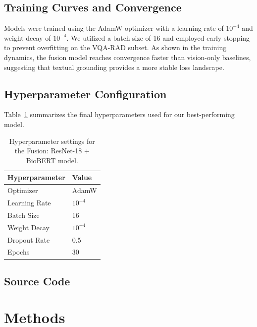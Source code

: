 \documentclass{article}
\begin{document}
{\subsection{Training Curves and Convergence}
Models were trained using the AdamW optimizer with a learning rate of $10^{-4}$ and weight decay of $10^{-4}$. We utilized a batch size of 16 and employed early stopping to prevent overfitting on the VQA-RAD subset. As shown in the training dynamics, the fusion model reaches convergence faster than vision-only baselines, suggesting that textual grounding provides a more stable loss landscape.


\subsection{Hyperparameter Configuration}
Table~\ref{tab:hyperparams} summarizes the final hyperparameters used for our best-performing model.

\begin{table}[h]
  \caption{Hyperparameter settings for the Fusion: ResNet-18 + BioBERT model.}
  \label{tab:hyperparams}
  \centering
  \begin{tabular}{ll}
    \toprule
    Hyperparameter & Value \\
    \midrule
    Optimizer & AdamW \\
    Learning Rate & $10^{-4}$ \\
    Batch Size & 16 \\
    Weight Decay & $10^{-4}$ \\
    Dropout Rate & 0.5 \\
    Epochs & 30 \\
    \bottomrule
  \end{tabular}
\end{table}

\subsection{Source Code}
\section{Methods}

}
\end{document}
